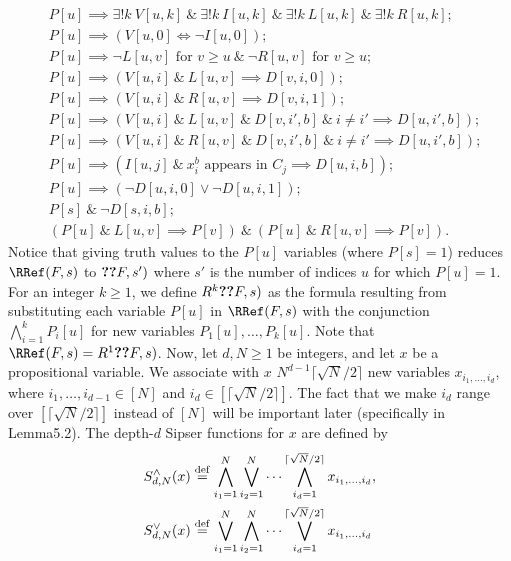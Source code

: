\begin{align*}
&P[u]\implies\exists!k\ V[u,k]\ \&\ \exists!k\ I[u,k]\ \&\ \exists!k\ L[u,k]\ \&\ \exists!k\ R[u,k];\tag{3.11}\\
&P[u]\implies(V[u,0]\iff\neg I[u,0]);\tag{3.12}\\
&P[u]\implies\neg L[u,v]\text{ for }v\ge u\ \&\ \neg R[u,v]\text{ for }v\ge u;\tag{3.13}\\
&P[u]\implies(V[u,i]\ \&\ L[u,v]\implies D[v,i,0]);\tag{3.14}\\
&P[u]\implies(V[u,i]\ \&\ R[u,v]\implies D[v,i,1]);\tag{3.15}\\
&P[u]\implies(V[u,i]\ \&\ L[u,v]\ \&\ D[v,i',b]\ \&\ i\ne i'\implies D[u,i',b]);\tag{3.16}\\
&P[u]\implies(V[u,i]\ \&\ R[u,v]\ \&\ D[v,i',b]\ \&\ i\ne i'\implies D[u,i',b]);\tag{3.17}\\
&P[u]\implies(I[u,j]\ \&\ x_i^b\text{ appears in }C_j\implies D[u,i,b]);\tag{3.18}\\
&P[u]\implies(\neg D[u,i,0]\vee\neg D[u,i,1]);\tag{3.19}\\
&P[s]\ \&\ \neg D[s,i,b];\tag{3.20}\\
&(P[u]\ \&\ L[u,v]\implies P[v])\ \&\ (P[u]\ \&\ R[u,v]\implies P[v]).\tag{3.21}
\end{align*}
Notice that giving truth values to the $P[u]$ variables (where $P[s]=1$) reduces $\RRef(F,s)$ to $\Ref(F,s')$ where $s'$ is the number of indices $u$ for which $P[u]=1$.
For an integer $k\ge1$, we define $R^k\Ref(F,s)$ as the formula resulting from substituting each variable $P[u]$ in $\RRef(F,s)$ with the conjunction $\bigwedge_{i=1}^kP_i[u]$ for new variables $P_1[u],\ldots,P_k[u]$. Note that $\RRef(F,s)=R^1\Ref(F,s)$.
Now, let $d,N\ge1$ be integers, and let $x$ be a propositional variable. We associate with $x$ $N^{d-1}\lceil\sqrt N/2\rceil$ new variables $x_{i_1,\ldots,i_d}$, where $i_1,\ldots,i_{d-1}\in[N]$ and $i_d\in[\lceil\sqrt N/2\rceil]$. The fact that we make $i_d$ range over $[\lceil\sqrt N/2\rceil]$ instead of $[N]$ will be important later (specifically in Lemma5.2). The depth-$d$ Sipser functions for $x$ are defined by
\begin{align*}
S_{d,N}^{\wedge}(x)&\stackrel{\rm def}=\bigwedge_{i_1=1}^N\bigvee_{i_2=1}^N\cdots\bigwedge_{i_d=1}^{\lceil\sqrt N/2\rceil}x_{i_1,\ldots,i_d},\\
S_{d,N}^{\vee}(x)&\stackrel{\rm def}=\bigvee_{i_1=1}^N\bigwedge_{i_2=1}^N\cdots\bigvee_{i_d=1}^{\lceil\sqrt N/2\rceil}x_{i_1,\ldots,i_d}
\end{align*}

